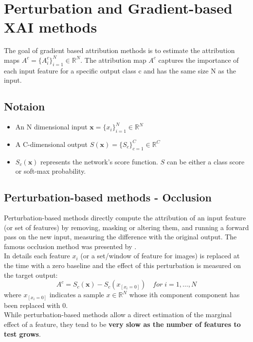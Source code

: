 \section{Perturbation and Gradient-based XAI methods}
The goal of gradient based attribution methods is to estimate the attribution maps $A^c=\{A_i^c\}^N_{i=1}\in \mathbb{R}^N$.
The attribution map $A^c$ captures the importance of each input feature for a specific output class c and has the
same size N as the input.

\subsection{Notaion}
\begin{itemize}
    \item An N dimensional input $\bm{x}=\{x_i\}_{i=1}^N \in \mathbb{R}^N$
    \item A C-dimensional output $S(\bm{x})=\{S_c\}_{c=1}^C \in \mathbb{R}^C$
    \item $S_c(\bm{x})$ represents the network's score function. $S$ can be either a class score or soft-max probability.
\end{itemize}

\subsection{Perturbation-based methods - Occlusion}
Perturbation-based methods directly compute the attribution of an input feature (or set of features) by removing, masking or altering them, and running a forward pass on the new input, measuring the difference with the original output.
The famous occlusion method was presented by \cite{DBLP:conf/eccv/ZeilerF14}. \\
In details each feature $x_i$ (or a set/window of feature for images) is replaced at the time with a zero baseline and the effect of this perturbation is measured 
on the target output:
\begin{equation*}
    A^c = S_c(\bm{x})-S_c(x_{[x_i=0]}) \quad for\; i = 1, \ldots, N
\end{equation*}
where $x_{[x_i=0]}$ indicates a sample $x\in\mathbb{R}^N$ whose ith component component has been replaced with 0.\\

While perturbation-based methods allow a direct estimation of the marginal effect of a feature, they tend to be \textbf{very slow as the number of features to test grows}.\\

